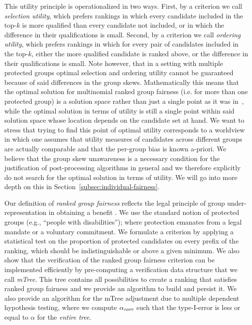 This utility principle is operationalized in two ways.
%
First, by a criterion we call \emph{selection utility}, which prefers rankings in which every candidate included in the top-$k$ is more qualified than every candidate not included, or in which the difference in their qualifications is small.
%
Second, by a criterion we call \emph{ordering utility}, which prefers rankings in which for every pair of candidates included in the top-$k$, either the more qualified candidate is ranked above, or the difference in their qualifications is small.
%
Note however, that in a setting with multiple protected groups optimal selection and ordering utility cannot be guaranteed because of said differences in the group skews.
%
Mathematically this means that the optimal solution for multinomial ranked group fairness (i.e. for more than one protected group) is a solution space rather than just a single point as it was in~\cite{zehlike2017fair}, while the optimal solution in terms of utility is still a single point within said solution space whose location depends on the candidate set at hand.
%
We want to stress that trying to find this point of optimal utility corresponds to a worldview in which one assumes that utility measures of candidates across different groups are actually comparable and that the per-group bias is known a-priori.
%
We believe that the group skew unawareness is a necessary condition for the justification of post-processing algorithms in general and we therefore explicitly do not search for the optimal solution in terms of utility.
%
We will go into more depth on this in Section~\ref{subsec:individual-fairness}.

Our definition of \emph{ranked group fairness} reflects the legal principle of group under-representation in obtaining a benefit \cite{ellis2012eu,lerner2003group}.
%
We use the standard notion of protected groups (e.g., ``people with disabilities''); where protection emanates from a legal mandate or a voluntary commitment.
%
%
We formulate a criterion by applying a statistical test on the proportion of protected candidates on every prefix of the ranking, which should be indistinguishable or above a given minimum.
%
%
We also show that the verification of the ranked group fairness criterion can be implemented efficiently by pre-computing a verification data structure that we call \emph{mTree}.
%
This tree contains all possibilities to create a ranking that satisfies ranked group fairness and we provide an algorithm to build and persist it.
%
We also provide an algorithm \algoCorrect for the mTree adjustment due to multiple dependent hypothesis testing, where we compute $\alpha_\textit{corr}$ such that the type-I-error is less or equal to $\alpha$ for the \emph{entire tree}.

